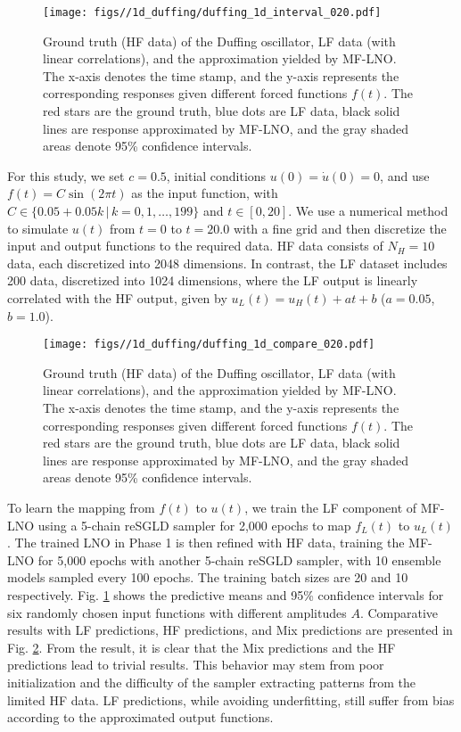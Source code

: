 \begin{figure}[!htbp]
    \centering
    \texttt{[image: figs//1d\_duffing/duffing\_1d\_interval\_020.pdf]}
    \caption{Ground truth (HF data) of the Duffing oscillator, LF data (with linear correlations), and the approximation yielded by MF-LNO. The x-axis denotes the time stamp, and the y-axis represents the corresponding responses given different forced functions $f(t)$. The red stars are the ground truth, blue dots are LF data, black solid lines are response approximated by MF-LNO, and the gray shaded areas denote 95\% confidence intervals.}
    \label{fig:duffing1}
\end{figure}

For this study, we set $c=0.5$, initial conditions $u(0)=\dot u(0)=0$, and use $f(t) = C \sin(2\pi t)$ as the input function, with $C \in \{0.05 + 0.05k \,|\, k = 0, 1, \dots, 199\}$ and $t \in [0, 20]$. We use a numerical method to simulate $u(t)$ from $t=0$ to $t=20.0$ with a fine grid and then discretize the input and output functions to the required data. HF data consists of $N_H = 10$ data, each discretized into 2048 dimensions. In contrast, the LF dataset includes 200 data, discretized into 1024 dimensions, where the LF output is linearly correlated with the HF output, given by $u_L(t) = u_H(t) + a t + b$ ($a = 0.05$, $b = 1.0$).

\begin{figure}[!htbp]
    \centering
    \texttt{[image: figs//1d\_duffing/duffing\_1d\_compare\_020.pdf]}
    \caption{Ground truth (HF data) of the Duffing oscillator, LF data (with linear correlations), and the approximation yielded by MF-LNO. The x-axis denotes the time stamp, and the y-axis represents the corresponding responses given different forced functions $f(t)$. The red stars are the ground truth, blue dots are LF data, black solid lines are response approximated by MF-LNO, and the gray shaded areas denote 95\% confidence intervals.}
    \label{fig:duffing2}
\end{figure}

To learn the mapping from $f(t)$ to $u(t)$, we train the LF component of MF-LNO using a 5-chain reSGLD sampler for 2,000 epochs to map $f_L(t)$ to $u_L(t)$. The trained LNO in Phase 1 is then refined with HF data, training the MF-LNO for 5,000 epochs with another 5-chain reSGLD sampler, with 10 ensemble models sampled every 100 epochs. The training batch sizes are 20 and 10 respectively. Fig. \ref{fig:duffing1} shows the predictive means and 95\% confidence intervals for six randomly chosen input functions with different amplitudes $A$. Comparative results with LF predictions, HF predictions, and Mix predictions are presented in Fig. \ref{fig:duffing2}. From the result, it is clear that the Mix predictions and the HF predictions lead to trivial results. This behavior may stem from poor initialization and the difficulty of the sampler extracting patterns from the limited HF data. LF predictions, while avoiding underfitting, still suffer from bias according to the approximated output functions.


